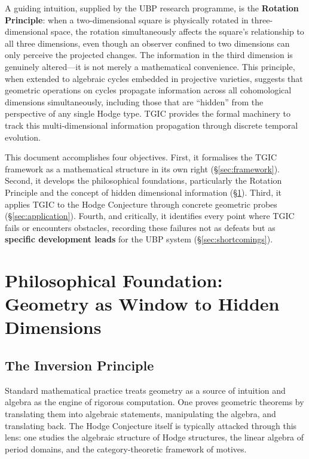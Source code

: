 \documentclass[11pt,a4paper]{article}
\theoremstyle{definition}
\theoremstyle{plain}
\begin{document}
A guiding intuition, supplied by the UBP research programme, is the \textbf{Rotation Principle}: when a two-dimensional square is physically rotated in three-dimensional space, the rotation simultaneously affects the square's relationship to all three dimensions, even though an observer confined to two dimensions can only perceive the projected changes. The information in the third dimension is genuinely altered---it is not merely a mathematical convenience. This principle, when extended to algebraic cycles embedded in projective varieties, suggests that geometric operations on cycles propagate information across all cohomological dimensions simultaneously, including those that are ``hidden'' from the perspective of any single Hodge type. TGIC provides the formal machinery to track this multi-dimensional information propagation through discrete temporal evolution.

This document accomplishes four objectives. First, it formalises the TGIC framework as a mathematical structure in its own right (\S\ref{sec:framework}). Second, it develops the philosophical foundations, particularly the Rotation Principle and the concept of hidden dimensional information (\S\ref{sec:philosophy}). Third, it applies TGIC to the Hodge Conjecture through concrete geometric probes (\S\ref{sec:application}). Fourth, and critically, it identifies every point where TGIC fails or encounters obstacles, recording these failures not as defeats but as \textbf{specific development leads} for the UBP system (\S\ref{sec:shortcomings}).

\section{Philosophical Foundation: Geometry as Window to Hidden Dimensions}\label{sec:philosophy}

\subsection{The Inversion Principle}

Standard mathematical practice treats geometry as a source of intuition and algebra as the engine of rigorous computation. One proves geometric theorems by translating them into algebraic statements, manipulating the algebra, and translating back. The Hodge Conjecture itself is typically attacked through this lens: one studies the algebraic structure of Hodge structures, the linear algebra of period domains, and the category-theoretic framework of motives.
\end{document}
